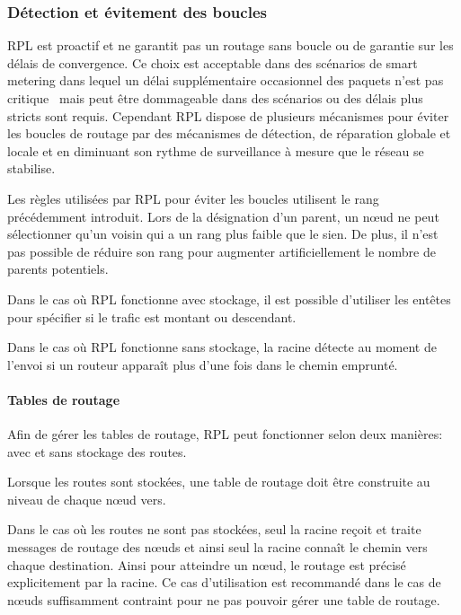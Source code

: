 \subsubsection{Détection et évitement des boucles}

\ac{RPL} est proactif et ne garantit pas un routage sans boucle ou de garantie sur les délais de convergence.
Ce choix est acceptable dans des scénarios de smart metering dans lequel un délai supplémentaire occasionnel des paquets n'est pas critique~\cite{yan2013survey} mais peut être dommageable dans des scénarios ou des délais plus stricts sont requis.
Cependant \ac{RPL} dispose de plusieurs mécanismes pour éviter les boucles de routage par des mécanismes de détection, de réparation globale et locale et en diminuant son rythme de surveillance à mesure que le réseau se stabilise.


Les règles utilisées par \ac{RPL} pour éviter les boucles utilisent le rang précédemment introduit.
Lors de la désignation d'un parent, un nœud ne peut sélectionner qu'un voisin qui a un rang plus faible que le sien.
De plus, il n'est pas possible de réduire son rang pour augmenter artificiellement le nombre de parents potentiels.

Dans le cas où \ac{RPL} fonctionne avec stockage, il est possible d'utiliser les entêtes pour spécifier si le trafic est montant ou descendant.

Dans le cas où \ac{RPL} fonctionne sans stockage, la racine détecte au moment de l'envoi si un routeur apparaît plus d'une fois dans le chemin emprunté.

\paragraph{Tables de routage}

Afin de gérer les tables de routage, \ac{RPL} peut fonctionner selon deux manières: avec et sans stockage des routes.

Lorsque les routes sont stockées, une table de routage doit être construite au niveau de chaque nœud vers.

Dans le cas où les routes ne sont pas stockées, seul la racine reçoit et traite messages de routage des nœuds et ainsi seul la racine connaît le chemin vers chaque destination.
Ainsi pour atteindre un nœud, le routage est précisé explicitement par la racine.
Ce cas d'utilisation est recommandé dans le cas de nœuds suffisamment contraint pour ne pas pouvoir gérer une table de routage.

